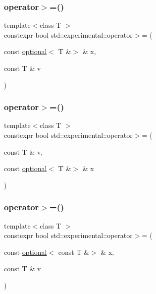 \mbox{\label{namespacestd_1_1experimental_a8e331f49161fae9a2dc83a0838d5c332}} 
\subsubsection{\texorpdfstring{operator$>$=()}{operator>=()}\hspace{0.1cm}{\footnotesize\ttfamily [6/9]}}
{\footnotesize\ttfamily template$<$class T $>$ \\
constexpr bool std\+::experimental\+::operator$>$= (\begin{DoxyParamCaption}\item[{const \hyperlink{classstd_1_1experimental_1_1optional}{optional}$<$ T \&$>$ \&}]{x,  }\item[{const T \&}]{v }\end{DoxyParamCaption})}

\mbox{\label{namespacestd_1_1experimental_af08a779caea9116149f04d2b2e330b44}} 
\subsubsection{\texorpdfstring{operator$>$=()}{operator>=()}\hspace{0.1cm}{\footnotesize\ttfamily [7/9]}}
{\footnotesize\ttfamily template$<$class T $>$ \\
constexpr bool std\+::experimental\+::operator$>$= (\begin{DoxyParamCaption}\item[{const T \&}]{v,  }\item[{const \hyperlink{classstd_1_1experimental_1_1optional}{optional}$<$ T \&$>$ \&}]{x }\end{DoxyParamCaption})}

\mbox{\label{namespacestd_1_1experimental_a43c159cf8ffd0e172adbac601809aacd}} 
\subsubsection{\texorpdfstring{operator$>$=()}{operator>=()}\hspace{0.1cm}{\footnotesize\ttfamily [8/9]}}
{\footnotesize\ttfamily template$<$class T $>$ \\
constexpr bool std\+::experimental\+::operator$>$= (\begin{DoxyParamCaption}\item[{const \hyperlink{classstd_1_1experimental_1_1optional}{optional}$<$ const T \&$>$ \&}]{x,  }\item[{const T \&}]{v }\end{DoxyParamCaption})}


